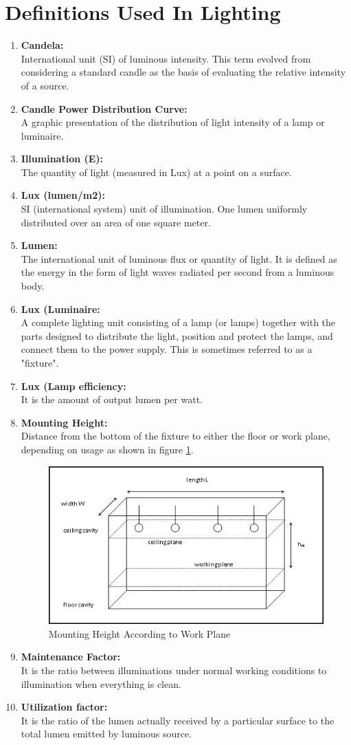 \documentclass[12pt,fleqn]{book} %
\begin{document}
 \section{Definitions Used In Lighting}
\begin{enumerate}
\item \textbf {Candela:}
\\International unit (SI) of luminous intensity. This term evolved from considering a standard candle as the basis of evaluating the relative intensity of a source.
\item \textbf {Candle Power Distribution Curve:}
\\A graphic presentation of the distribution of light intensity of a lamp or luminaire.
\item \textbf {Illumination (E):}
\\The quantity of light (measured in Lux) at a point on a surface.
\item \textbf {Lux (lumen/m2):}
\\SI (international system) unit of illumination. One lumen uniformly distributed over an area of one square meter.
\item \textbf {Lumen:}
\\The international unit of luminous flux or quantity of light. It is defined as the energy in the form of light waves radiated per second from a luminous body.
\item \textbf {Lux (Luminaire:}
\\A complete lighting unit consisting of a lamp (or lamps) together with the parts designed to distribute the light, position and protect the lamps, and connect them to the power supply. This is sometimes referred to as a "fixture".
\item \textbf {Lux (Lamp efficiency:}
\\It is the amount of output lumen per watt.
\item \textbf {Mounting Height:}
\\Distance from the bottom of the fixture to either the floor or work plane, depending on usage as shown in figure \ref{fig:fikry 5}.
\begin{figure}[!h]
    \centering
    \includegraphics[width=0.5\linewidth]{fikry 5.png}
    \caption{Mounting Height According to Work Plane}
    \label{fig:fikry 5}
\end{figure}
\item \textbf {Maintenance Factor:}
\\It is the ratio between illuminations under normal working conditions to illumination when everything is clean.
\item \textbf {Utilization factor:}
\\It is the ratio of the lumen actually received by a particular surface to the total lumen emitted by
luminous source.
\end{enumerate}
\end{document}
